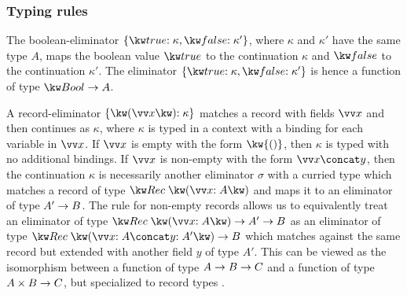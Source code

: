 

\noindent

\subsubsection{Typing rules}
\label{sssec:typing-terms}



The boolean-eliminator $\elimBool{\kappa}{\kappa'}$, where $\kappa$ and $\kappa'$ have the same type $A$, maps the boolean value $\exTrue$ to the continuation $\kappa$ and $\exFalse$ to the continuation $\kappa'$. The eliminator $\elimBool{\kappa}{\kappa'}$ is hence a function of type $\tyFun{\tyBool}{A}$. 

A record-eliminator $\elimRec{\seq{x}}{\kappa}$ matches a record with fields $\seq{x}$ and then continues as $\kappa$, where $\kappa$ is typed in a context with a binding for each variable in $\seq{x}$. If $\seq{x}$ is empty with the form $\kw{()}$, then $\kappa$ is typed with no additional bindings. If $\seq{x}$ is non-empty with the form $\vec{x} \concat y$, then the continuation $\kappa$ is necessarily another eliminator $\sigma$ with a curried type which matches a record of type $\tyRec{\vec{\bind{x}{A}}}$ and maps it to an eliminator of type ${A'}\rightarrow{B}$. The rule for non-empty records allows us to equivalently treat an eliminator of type $\tyFun{\tyRec{\vec{\bind{x}{A}}}}{\tyFun{A'}{B}}$ as an eliminator of type $\tyFun{\tyRec{\vec{\bind{x}{A}} \concat \bind{y}{A'}}}{B}$ which matches against the same record but extended with another field $y$ of type $A'$. This can be viewed as the isomorphism between a function of type ${{A}\rightarrow{B}}\rightarrow{C}$ and a function of type ${{A}\times{B}}\rightarrow{C}$, but specialized to record types \cite{hinze00}. 

